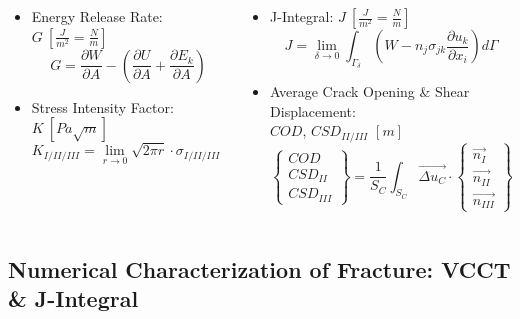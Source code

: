 \documentclass[first,firstsupp,lastsupp,last,hyperref,table]{ETHclass}
\begin{document}
\begin{frame}
\begin{columns}[c]
\begin{column}{0.5\textwidth}
\begin{itemize}[label=]
\item Energy Release Rate: $G\ \left[\frac{J}{m^{2}}=\frac{N}{m}\right]$
\begin{equation*}
G=\frac{\partial W}{\partial A} - \left(\frac{\partial U}{\partial A}+\frac{\partial E_{k}}{\partial A}\right)
\end{equation*}
\item Stress Intensity Factor: $K\ \left[Pa\sqrt{m}\right]$
\begin{equation*}
K_{I/II/III}=\lim_{r\to 0}\sqrt{2\pi r}\cdot\sigma_{I/II/III}\left(r,0\right)
\end{equation*}
\end{itemize}
\end{column}
\begin{column}{0.5\textwidth}
\begin{itemize}[label=]
\item J-Integral: $J\ \left[\frac{J}{m^{2}}=\frac{N}{m}\right]$
\begin{equation*}
J=\lim_{\delta\to 0}\int_{\Gamma_{\delta}}\left(W-n_{j}\sigma_{jk}\frac{\partial u_{k}}{\partial x_{i}}\right)d\Gamma
\end{equation*}
\item Average Crack Opening \& Shear Displacement:\\ $COD$, $CSD_{II/III}$ $\left[m\right]$
\begin{equation*}
\begin{Bmatrix}
COD\\
CSD_{II}\\
CSD_{III}
\end{Bmatrix}=\frac{1}{S_{C}}\int_{S_{C}}\overrightarrow{\Delta u_{C}}\cdot\begin{Bmatrix}
\overrightarrow{n_{I}}\\
\overrightarrow{n_{II}}\\
\overrightarrow{n_{III}}
\end{Bmatrix}dS
\end{equation*}
\end{itemize}
\end{column}
\end{columns}
\end{frame}

\subsection[Numerical Characterization of Fracture]{Numerical Characterization of Fracture: VCCT \& J-Integral}
\end{document}
